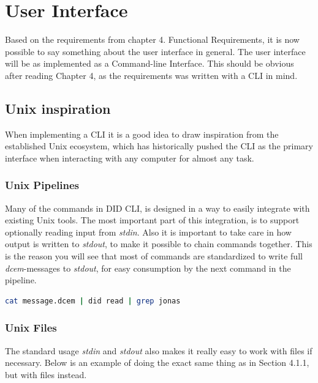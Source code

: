 \hypertarget{user-interface}{%
\chapter{User Interface}\label{user-interface}}

Based on the requirements from chapter 4. Functional Requirements, it is
now possible to say something about the user interface in general. The
user interface will be as implemented as a Command-line Interface.
This should be obvious after reading Chapter 4, as the requirements was written with a CLI in mind.

\hypertarget{unix-inspiration}{%
\section{Unix inspiration}\label{unix-inspiration}}

When implementing a CLI it is a good idea to draw inspiration from the
established Unix ecosystem, which has historically pushed the CLI as the
primary interface when interacting with any computer for almost any
task.

\hypertarget{unix-pipelines}{%
\subsection{Unix Pipelines}\label{unix-pipelines}}

Many of the commands in DID CLI, is designed in a way to
easily integrate with existing Unix tools. The most important part of
this integration, is to support optionally reading input from
\emph{stdin}. Also it is important to take care in how output is written
to \emph{stdout}, to make it possible to chain commands together. This
is the reason you will see that most of commands are standardized to
write full \emph{dcem}-messages to \emph{stdout}, for easy consumption
by the next command in the pipeline.

\begin{lstlisting}[language=bash]
cat message.dcem | did read | grep jonas
\end{lstlisting}

\hypertarget{unix-files}{%
\subsection{Unix Files}\label{unix-files}}

The standard usage \emph{stdin} and \emph{stdout} also makes it really
easy to work with files if necessary. Below is an example of doing the
exact same thing as in Section 4.1.1, but with files instead.

